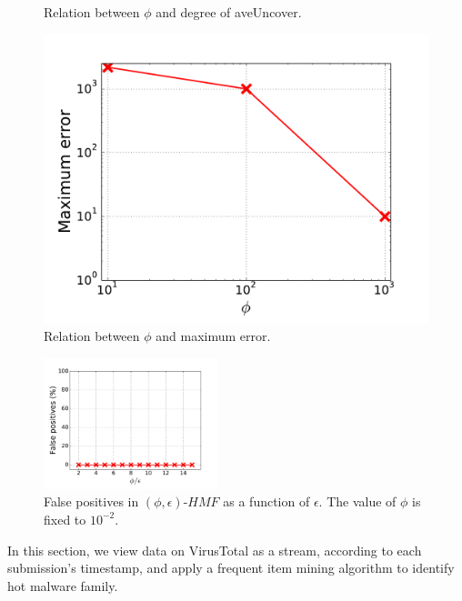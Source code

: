 \begin{figure}[!htb]
  \caption{Relation between $\phi$ and degree of aveUncover.}
  \label{fig:aveUncover}
\endminipage\hfill
{}%
  \includegraphics[width=\linewidth]{figure/maxError.pdf}
  \caption{Relation between $\phi$ and maximum error.}
  \label{fig:maxError}

\endminipage
\end{figure}

\begin{figure}[t!]
\begin{center}
\includegraphics[width=2.0in]{figure/fp}
\caption{False positives in $(\phi, \epsilon)\mbox{-}HMF$ as a function of $\epsilon$. The value of $\phi$ is fixed to $10^{-2}$.}
\label{fig:fp}
\end{center}
\end{figure}

In this section, we view data on VirusTotal as a stream, according to each submission's timestamp, 
and apply a frequent item mining algorithm to identify hot malware family. 


